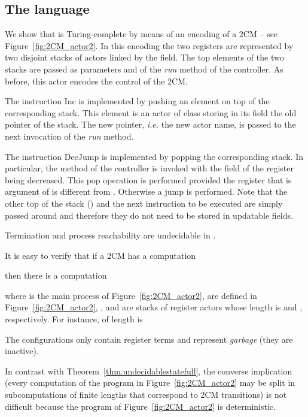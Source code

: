 \documentclass{LMCS}
\theoremstyle{plain}\newtheorem{proposition}[thm]{Proposition}
\theoremstyle{plain}\newtheorem{lemma}[thm]{Lemma}
\theoremstyle{plain}\newtheorem{theorem}[thm]{Theorem}
\theoremstyle{plain}\newtheorem{corollary}[thm]{Corollary}
\newif\ifconf \conffalse
\newcommand{\actro}{}
\begin{document}
\subsection{The language {\actro}}
\label{ssec.readonly}
We show that {\actro}
is Turing-complete by means of an encoding of a 2CM
-- see Figure~\ref{fig:2CM_actor2}. 
In this encoding the two registers
are represented by two disjoint stacks of actors linked by the  field.
The top elements of the two stacks are passed as parameters  and  
of the {\it run} method
of the controller. As before, this actor encodes the control of the 2CM.

The instruction {\sf Inc} is implemented by pushing an element on top of the
corresponding stack. This element is an actor of class  
storing in its field 
the old pointer of the stack. The new pointer, \emph{i.e.} the new actor name,
is
passed to the next invocation of the {\it run} method.


The instruction {\sf DecJump} is implemented by popping the corresponding
stack. In particular, the method  of the controller is invoked with the
field  of the register being decreased. This pop operation is
performed provided the register that is argument of  is different
from . Otherwise a jump is performed.
Note that the other top of the stack  () and the next instruction
to be executed are simply passed around and therefore they do not need
to be stored in updatable fields.

\begin{thm}
\label{thm.undecidablestateless}
Termination and process reachability 
are undecidable in {\actro}.
\end{thm}

\ifconf
\else

\proof
It is easy to verify that if a 2CM has a computation

then there is a computation

where  is the main process of Figure~\ref{fig:2CM_actor2},
 are defined in 
Figure~\ref{fig:2CM_actor2},
,  and  are
stacks of register actors whose length is  and , respectively. For
instance,  of length  is

The configurations  only contain register  terms  and represent \emph{garbage} (they are
inactive).

In contrast with Theorem~\ref{thm.undecidablestatefull}, the converse 
implication (every computation of the  {\actro} program in Figure~\ref{fig:2CM_actor2}
may be split in subcomputations of finite lengths that correspond to 
2CM transitions) is not difficult because the program of Figure~\ref{fig:2CM_actor2}
is deterministic.
\end{document}
